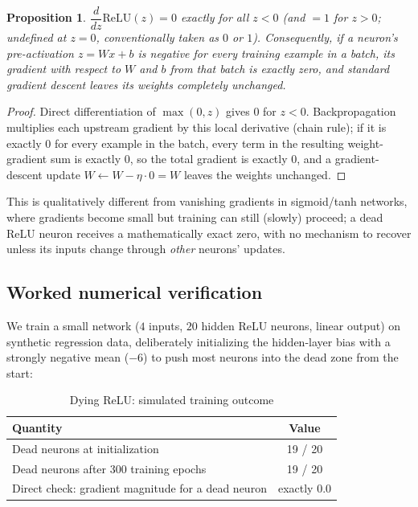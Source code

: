 \documentclass[10pt,journal,compsoc]{IEEEtran}
\newtheorem{proposition}{Proposition}
\begin{document}
\begin{proposition}
$\dfrac{d}{dz}\mathrm{ReLU}(z) = 0$ exactly for all $z<0$ (and $=1$ for $z>0$; undefined at $z=0$, conventionally taken as $0$ or $1$). Consequently, if a neuron's pre-activation $z=Wx+b$ is negative for every training example in a batch, its gradient with respect to $W$ and $b$ from that batch is exactly zero, and standard gradient descent leaves its weights completely unchanged.
\end{proposition}
\begin{proof}
Direct differentiation of $\max(0,z)$ gives $0$ for $z<0$. Backpropagation multiplies each upstream gradient by this local derivative (chain rule); if it is exactly $0$ for every example in the batch, every term in the resulting weight-gradient sum is exactly $0$, so the total gradient is exactly $0$, and a gradient-descent update $W \leftarrow W - \eta\cdot 0 = W$ leaves the weights unchanged.
\end{proof}
This is qualitatively different from vanishing gradients in sigmoid/tanh networks, where gradients become small but training can still (slowly) proceed; a dead ReLU neuron receives a mathematically exact zero, with no mechanism to recover unless its inputs change through \emph{other} neurons' updates.

\subsection{Worked numerical verification}
We train a small network ($4$ inputs, $20$ hidden ReLU neurons, linear output) on synthetic regression data, deliberately initializing the hidden-layer bias with a strongly negative mean ($-6$) to push most neurons into the dead zone from the start:

\begin{table}[h]
\centering
\caption{Dying ReLU: simulated training outcome}
\begin{tabular}{lc}
\toprule
\textbf{Quantity} & \textbf{Value} \\
\midrule
Dead neurons at initialization & 19 / 20 \\
Dead neurons after 300 training epochs & 19 / 20 \\
Direct check: gradient magnitude for a dead neuron & exactly $0.0$ \\
\bottomrule
\end{tabular}
\end{table}
\end{document}
